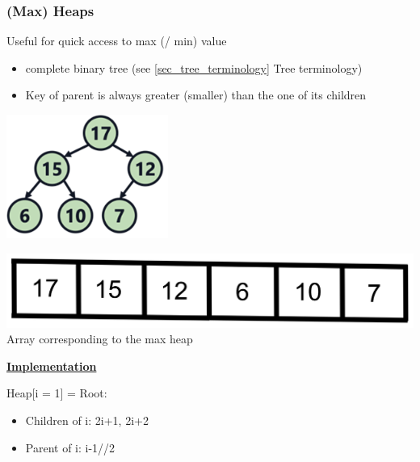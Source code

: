 \subsubsection{(Max) Heaps}
    Useful for quick access to max (/ min) value
    \begin{itemize}
        \item complete binary tree (see \ref{sec_tree_terminology} Tree terminology)
        \item Key of parent is always greater (smaller) than the one of its children
    \end{itemize}
    \begin{minipage}{0.49\linewidth}
        \includegraphics[width = 0.95\linewidth]{src/4_data_structure/images/max_heap.png}
    \end{minipage}
    \begin{minipage}{0.49\linewidth}
        \includegraphics[width = 0.95\linewidth]{src/4_data_structure/images/max_heap_array.png}
        Array corresponding to the max heap
    \end{minipage}

    {\centering\underline{\textbf{Implementation}} \par}
        Heap[i = 1] = Root:\\
        \begin{itemize}
            \item Children of i: {2i+1, 2i+2}
            \item Parent of i: i-1//2
        \end{itemize}

